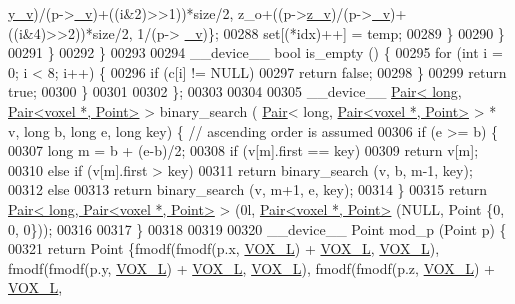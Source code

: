 \begin{DoxyCode}
{      \hyperlink{classleaf_a06a94d40da44b846913db4d8900b2626}{y\_v})/(p->\hyperlink{classleaf_a4fc347dbd4f5911bbb477910588ed512}{\_v})+((i&2)>>1))*size/2, z\_o+((p->\hyperlink{classleaf_a5f51fe13eb6e53bd9549469011e7a10e}{z\_v})/(p->\hyperlink{classleaf_a4fc347dbd4f5911bbb477910588ed512}{\_v})+((i&4)>>2))*size/2, 1/(p->
      \hyperlink{classleaf_a4fc347dbd4f5911bbb477910588ed512}{\_v})\};
00288                     \textcolor{keyword}{set}[(*idx)++] = temp;
00289                 \}
00290             \}
00291         \}
00292     \}
00293 
00294     \_\_device\_\_ \textcolor{keywordtype}{bool} is\_empty () \{
00295         \textcolor{keywordflow}{for} (\textcolor{keywordtype}{int} i = 0; i < 8; i++) \{
00296             \textcolor{keywordflow}{if} (c[i] != NULL)
00297                 \textcolor{keywordflow}{return} \textcolor{keyword}{false};
00298         \}
00299         \textcolor{keywordflow}{return} \textcolor{keyword}{true};
00300     \}
00301 
00302 \};
00303 
00304 
00305 \_\_device\_\_ \hyperlink{classPair}{Pair< long, Pair<voxel *, Point>} > binary\_search (
      \hyperlink{classPair}{Pair}< \textcolor{keywordtype}{long}, \hyperlink{classPair}{Pair<voxel *, Point>} > * v, \textcolor{keywordtype}{long} b, \textcolor{keywordtype}{long} e, \textcolor{keywordtype}{long} key) \{ \textcolor{comment}{// ascending
       order is assumed}
00306     \textcolor{keywordflow}{if} (e >= b) \{
00307         \textcolor{keywordtype}{long} m = b + (e-b)/2;
00308         \textcolor{keywordflow}{if} (v[m].first == key)
00309             \textcolor{keywordflow}{return} v[m];
00310         \textcolor{keywordflow}{else} \textcolor{keywordflow}{if} (v[m].first > key)
00311             \textcolor{keywordflow}{return} binary\_search (v, b, m-1, key);
00312         \textcolor{keywordflow}{else} 
00313             \textcolor{keywordflow}{return} binary\_search (v, m+1, e, key);
00314     \}
00315     \textcolor{keywordflow}{return} \hyperlink{classPair}{Pair< long, Pair<voxel *, Point>} > (0l, 
      \hyperlink{classPair}{Pair<voxel *, Point>} (NULL, Point \{0, 0, 0\}));
00316 
00317 \}
00318 
00319 
00320 \_\_device\_\_ Point mod\_p (Point p) \{
00321         \textcolor{keywordflow}{return} Point \{fmodf(fmodf(p.x, \hyperlink{Voxel_8hpp_a3c1c8b966e30fa8ca2de07abe3b3d74a}{VOX\_L}) + \hyperlink{Voxel_8hpp_a3c1c8b966e30fa8ca2de07abe3b3d74a}{VOX\_L}, \hyperlink{Voxel_8hpp_a3c1c8b966e30fa8ca2de07abe3b3d74a}{VOX\_L}), fmodf(fmodf(p.y, 
      \hyperlink{Voxel_8hpp_a3c1c8b966e30fa8ca2de07abe3b3d74a}{VOX\_L}) + \hyperlink{Voxel_8hpp_a3c1c8b966e30fa8ca2de07abe3b3d74a}{VOX\_L}, \hyperlink{Voxel_8hpp_a3c1c8b966e30fa8ca2de07abe3b3d74a}{VOX\_L}), fmodf(fmodf(p.z, \hyperlink{Voxel_8hpp_a3c1c8b966e30fa8ca2de07abe3b3d74a}{VOX\_L}) + \hyperlink{Voxel_8hpp_a3c1c8b966e30fa8ca2de07abe3b3d74a}{VOX\_L}, 
}
\end{DoxyCode}
